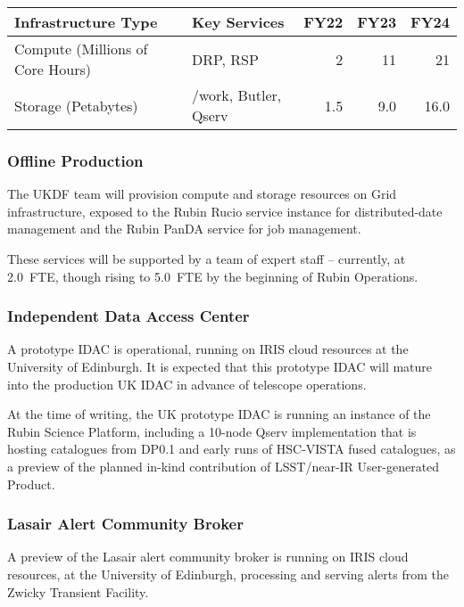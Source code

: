 
\begin{longtable} {|l  |l  |r  |r |r  |}
  \caption{\label{tab:ukdfInfrastructure}}
  \\
  \hline
  {\bf Infrastructure Type} & {\bf Key Services} & {\bf FY22} & {\bf FY23} & {\bf FY24} \\
  \hline
  Compute (Millions of Core Hours) & DRP, RSP & 2 & 11 & 21 \\
  \hline
  Storage (Petabytes) & /work, Butler, Qserv & 1.5 & 9.0 & 16.0 \\
  \hline
\end{longtable}

\subsubsection{Offline Production}

The UKDF team will provision compute and storage resources on Grid infrastructure, exposed to the Rubin Rucio service instance for distributed-date management and the Rubin PanDA service for job management.

These services will be supported by a team of expert staff -- currently, at 2.0~FTE, though rising to 5.0~FTE by the beginning of Rubin Operations.

\subsubsection{Independent Data Access Center}

A prototype IDAC is operational, running on IRIS cloud resources at the University of Edinburgh. It is expected that this prototype IDAC will mature into the production UK IDAC in advance of telescope operations.

At the time of writing, the UK prototype IDAC is running an instance of the Rubin Science Platform, including a 10-node Qserv implementation that is hosting catalogues from DP0.1 and early runs of HSC-VISTA fused catalogues, as a preview of the planned in-kind contribution of LSST/near-IR User-generated Product.

\subsubsection{Lasair Alert Community Broker}

A preview of the Lasair alert community broker is running on IRIS cloud resources, at the University of Edinburgh, processing and serving alerts from the Zwicky Transient Facility.
